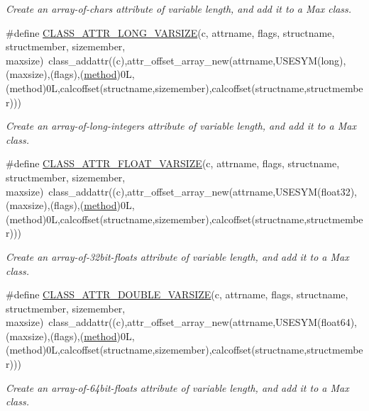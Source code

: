 \begin{DoxyCompactItemize}
\begin{DoxyCompactList}\small\item\em Create an array-\/of-\/chars attribute of variable length, and add it to a Max class. \item\end{DoxyCompactList}\item 
\#define \hyperlink{group__attr_ga481f8679851e2f6d5d99196ec86bc4e1}{CLASS\_\-ATTR\_\-LONG\_\-VARSIZE}(c, attrname, flags, structname, structmember, sizemember, maxsize)~class\_\-addattr((c),attr\_\-offset\_\-array\_\-new(attrname,USESYM(long),(maxsize),(flags),(\hyperlink{group__datatypes_gac26ba0a173b50597f5738132e059b42d}{method})0L,(method)0L,calcoffset(structname,sizemember),calcoffset(structname,structmember)))
\begin{DoxyCompactList}\small\item\em Create an array-\/of-\/long-\/integers attribute of variable length, and add it to a Max class. \item\end{DoxyCompactList}\item 
\#define \hyperlink{group__attr_ga42728b2c87e32f9efe5dadb9c72ce434}{CLASS\_\-ATTR\_\-FLOAT\_\-VARSIZE}(c, attrname, flags, structname, structmember, sizemember, maxsize)~class\_\-addattr((c),attr\_\-offset\_\-array\_\-new(attrname,USESYM(float32),(maxsize),(flags),(\hyperlink{group__datatypes_gac26ba0a173b50597f5738132e059b42d}{method})0L,(method)0L,calcoffset(structname,sizemember),calcoffset(structname,structmember)))
\begin{DoxyCompactList}\small\item\em Create an array-\/of-\/32bit-\/floats attribute of variable length, and add it to a Max class. \item\end{DoxyCompactList}\item 
\#define \hyperlink{group__attr_ga5fec0fa1c1f4d249bf363a6b8da58ff2}{CLASS\_\-ATTR\_\-DOUBLE\_\-VARSIZE}(c, attrname, flags, structname, structmember, sizemember, maxsize)~class\_\-addattr((c),attr\_\-offset\_\-array\_\-new(attrname,USESYM(float64),(maxsize),(flags),(\hyperlink{group__datatypes_gac26ba0a173b50597f5738132e059b42d}{method})0L,(method)0L,calcoffset(structname,sizemember),calcoffset(structname,structmember)))
\begin{DoxyCompactList}\small\item\em Create an array-\/of-\/64bit-\/floats attribute of variable length, and add it to a Max class. \item\end{DoxyCompactList}\item 

\end{DoxyCompactItemize}
